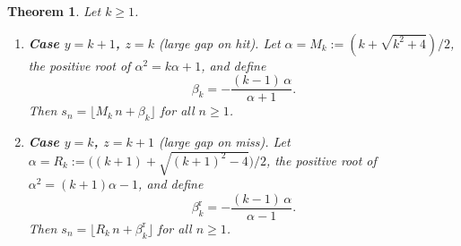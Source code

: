\documentclass[10pt,a4paper]{amsart}
\newtheorem{theorem}{Theorem}
\begin{document}
\begin{theorem}\label{thm:metallic-beatty}
Let $k\ge1$.
\begin{enumerate}
\item[\textup{(a)}] \textbf{Case $y=k+1$, $z=k$}
  \textup{(large gap on hit).}
  Let $\alpha=M_k:=(k+\sqrt{k^2+4})/2$, the positive root of
  $\alpha^2=k\alpha+1$, and define
  \begin{equation}\label{eq:metallic-beta}
    \beta_k=-\frac{(k-1)\,\alpha}{\alpha+1}.
  \end{equation}
  Then $s_n=\lfloor M_k\,n+\beta_k\rfloor$ for all $n\ge1$.

\item[\textup{(b)}] \textbf{Case $y=k$, $z=k+1$}
  \textup{(large gap on miss).}
  Let $\alpha=R_k:=\bigl((k+1)+\sqrt{(k+1)^2-4}\bigr)/2$, the
  positive root of $\alpha^2=(k+1)\alpha-1$, and define
  \begin{equation}\label{eq:reverse-beta}
    \beta_k^{\mathrm{r}}=-\frac{(k-1)\,\alpha}{\alpha-1}.
  \end{equation}
  Then $s_n=\lfloor R_k\,n+\beta_k^{\mathrm{r}}\rfloor$ for
  all $n\ge1$.
\end{enumerate}
\end{theorem}
\end{document}
